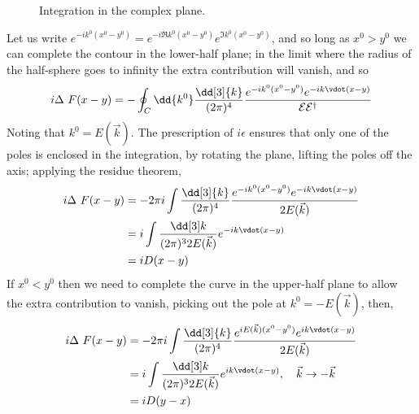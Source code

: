 \begin{figure}[h!]
  \centering
  \caption{Integration in the complex plane.}
  \label{fig:complexplane}
\end{figure}
Let us write $ e^{-i k^0(x^0-y^0)} = e^{-i \Re k^0(x^0-y^0)} e^{\Im
  k^0(x^0-y^0)} $, and so long as $x^0>y^0$ we can complete the
contour in the lower-half plane; in the limit where the radius of the
half-sphere goes to infinity the extra contribution will vanish, and so
\begin{align}
  \label{eq:48}
  i \Delta~F(x-y) = - \oint_C \dd{k^0} \frac{\dd[3]{k}}{(2 \pi)^4} 
                  \frac{e^{-ik^0(x^0-y^0)} e^{-ik \vdot(x-y)}}{\mathcal{E} \hcon{\mathcal{E}} }
\end{align}
Noting that $k^0 = E(\vec{k})$. The prescription of $i \epsilon$
ensures that only one of the poles is enclosed in the integration, by
rotating the plane, lifting the poles off the axis; applying the
residue theorem,
\begin{align*}
  \label{eq:48}
  i \Delta~F(x-y) &= -2 \pi i \int \frac{\dd[3]{k}}{(2 \pi)^4} 
                  \frac{e^{-ik^0(x^0-y^0)} e^{-ik \vdot(x-y)}}{2 E(\vec{k})} \\
&= i \int \normmeasure{k} e^{-ik\vdot(x-y)} \\ &= i D(x-y)
\end{align*}
If $x^0<y^0$ then we need to complete the curve in the upper-half
plane to allow the extra contribution to vanish, picking out the pole
at $k^0=-E(\vec{k})$, then, 
\begin{align*}
  \label{eq:48}
  i \Delta~F(x-y) &= -2 \pi i \int \frac{\dd[3]{k}}{(2 \pi)^4} 
                  \frac{e^{iE(\vec{k})(x^0-y^0)} e^{ik \vdot(x-y)}}{2 E(\vec{k})} \\
&= i \int \normmeasure{k} e^{ik\vdot(x-y)}, \quad \vec{k} \to - \vec{k}\\ &= i D(y-x)
\end{align*}


